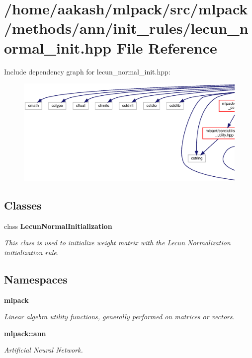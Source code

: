\section{/home/aakash/mlpack/src/mlpack/methods/ann/init\+\_\+rules/lecun\+\_\+normal\+\_\+init.hpp File Reference}
\label{lecun__normal__init_8hpp}
Include dependency graph for lecun\+\_\+normal\+\_\+init.\+hpp\+:
\nopagebreak
\begin{figure}[H]
\begin{center}
\leavevmode
\includegraphics[width=350pt]{lecun__normal__init_8hpp__incl}
\end{center}
\end{figure}
\subsection*{Classes}
\begin{DoxyCompactItemize}
\item 
class \textbf{ Lecun\+Normal\+Initialization}
\begin{DoxyCompactList}\small\item\em This class is used to initialize weight matrix with the Lecun Normalization initialization rule. \end{DoxyCompactList}\end{DoxyCompactItemize}
\subsection*{Namespaces}
\begin{DoxyCompactItemize}
\item 
 \textbf{ mlpack}
\begin{DoxyCompactList}\small\item\em Linear algebra utility functions, generally performed on matrices or vectors. \end{DoxyCompactList}\item 
 \textbf{ mlpack\+::ann}
\begin{DoxyCompactList}\small\item\em Artificial Neural Network. \end{DoxyCompactList}\end{DoxyCompactItemize}


